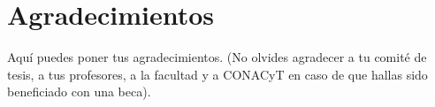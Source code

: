 
\chapter{Agradecimientos}

Aquí puedes poner tus agradecimientos. (No olvides agradecer a tu comité de tesis, a tus profesores, a la facultad y a CONACyT en caso de que hallas sido beneficiado con una beca).
